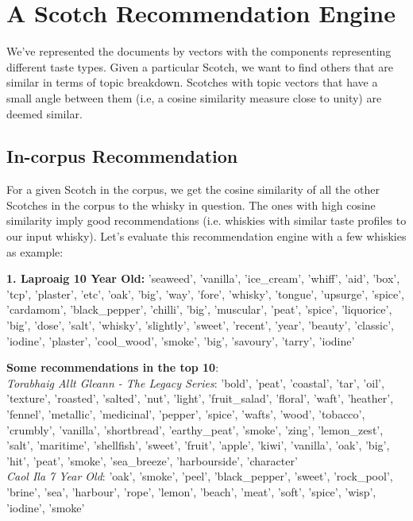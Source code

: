 \documentclass{article}
\begin{document}
\section{A Scotch Recommendation Engine}
We've represented the documents by vectors with the components representing different taste types. Given a particular Scotch, we want to find others that are similar in terms of topic breakdown. Scotches with topic vectors that have a small angle between them (i.e, a cosine similarity measure close to unity) are deemed similar.
\subsection{In-corpus Recommendation} For a given Scotch in the corpus, we get the cosine similarity of all the other Scotches in the corpus to the whisky in question. The ones with high cosine similarity imply good recommendations (i.e. whiskies with similar taste profiles to our input whisky). Let's evaluate this recommendation engine with a few whiskies as example:

\textbf{1. Laproaig 10 Year Old:} 
'seaweed', 'vanilla', 'ice\_cream', 'whiff', 'aid', 'box', 'tcp', 'plaster', 'etc', 'oak', 'big', 'way', 'fore', 'whisky', 'tongue', 'upsurge', 'spice', 'cardamom', 'black\_pepper', 'chilli', 'big', 'muscular', 'peat', 'spice', 'liquorice', 'big', 'dose', 'salt', 'whisky', 'slightly', 'sweet', 'recent', 'year', 'beauty', 'classic', 'iodine', 'plaster', 'cool\_wood', 'smoke', 'big', 'savoury', 'tarry', 'iodine'

\textbf{Some recommendations in the top 10}:\\
\textit{Torabhaig Allt Gleann - The Legacy Series}: 'bold', 'peat', 'coastal', 'tar', 'oil', 'texture', 'roasted', 'salted', 'nut', 'light', 'fruit\_salad', 'floral', 'waft', 'heather', 'fennel', 'metallic', 'medicinal', 'pepper', 'spice', 'wafts', 'wood', 'tobacco', 'crumbly', 'vanilla', 'shortbread', 'earthy\_peat', 'smoke', 'zing', 'lemon\_zest', 'salt', 'maritime', 'shellfish', 'sweet', 'fruit', 'apple', 'kiwi', 'vanilla', 'oak', 'big', 'hit', 'peat', 'smoke', 'sea\_breeze', 'harbourside', 'character' \\
\textit{Caol Ila 7 Year Old}: 'oak', 'smoke', 'peel', 'black\_pepper', 'sweet', 'rock\_pool', 'brine', 'sea', 'harbour', 'rope', 'lemon', 'beach', 'meat', 'soft', 'spice', 'wisp', 'iodine', 'smoke' 
\end{document}
